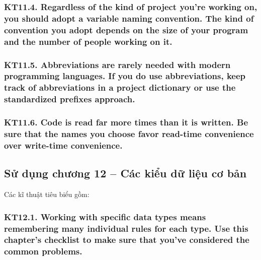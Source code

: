\documentclass[12pt]{report}
\begin{document}
\subsubsection{KT11.4. Regardless of the kind of project you're working on, you should adopt a variable naming convention. The kind of convention you adopt depends on the size of your program and the number of people working on it.}

\subsubsection{KT11.5. Abbreviations are rarely needed with modern programming languages. If you do use abbreviations, keep track of abbreviations in a project dictionary or use the standardized prefixes approach.}

\subsubsection{KT11.6. Code is read far more times than it is written. Be sure that the names you choose favor read-time convenience over write-time convenience.}


\subsection{Sử dụng chương 12 -- Các kiểu dữ liệu cơ bản}
\noindent Các kĩ thuật tiêu biểu gồm:
\subsubsection{KT12.1. Working with specific data types means remembering many individual rules for each type. Use this chapter's checklist to make sure that you've considered the common problems.}
\end{document}
